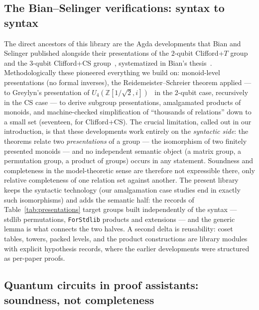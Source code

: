 \subsection{The Bian--Selinger verifications: syntax to syntax}

The direct ancestors of this library are the Agda developments that Bian
and Selinger published alongside their presentations of the $2$-qubit
Clifford+$T$ group~\cite{bian2023cliffordt2} and the $3$-qubit
Clifford+CS group~\cite{bian2023cliffordcs3}, systematized in Bian's
thesis~\cite{bian2023thesis}.  Methodologically these pioneered
everything we build on: monoid-level presentations (no formal inverses),
the Reidemeister--Schreier theorem applied --- to Greylyn's presentation
of $U_4(\mathbb{Z}[1/\sqrt2,i])$~\cite{greylyn2014} in the $2$-qubit
case, recursively in the CS case --- to derive subgroup presentations,
amalgamated products of monoids, and machine-checked simplification of
``thousands of relations'' down to a small set (seventeen, for
Clifford+CS).  The crucial
limitation, called out in our introduction, is that these developments
work entirely on the \emph{syntactic side}: the theorems relate two
\emph{presentations} of a group --- the isomorphism of two finitely
presented monoids --- and no independent semantic object (a matrix group,
a permutation group, a product of groups) occurs in any statement.
Soundness and completeness in the model-theoretic sense are therefore not
expressible there, only relative completeness of one relation set against
another.  The present library keeps the syntactic technology (our
amalgamation case studies end in exactly such isomorphisms) and adds the
semantic half: the  records of
Table~\ref{tab:presentations} target groups built independently of the
syntax --- stdlib permutations, \texttt{ForStdlib} products and
extensions --- and the generic  lemma is what
connects the two halves.  A second delta is reusability: coset tables,
towers, packed levels, and the product constructions are library modules
with explicit hypothesis records, where the earlier developments were
structured as per-paper proofs.

\subsection{Quantum circuits in proof assistants: soundness, not completeness}

